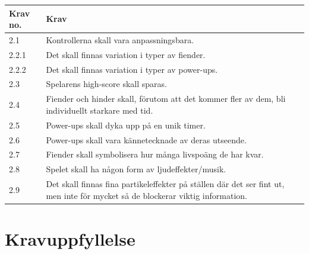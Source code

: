 \documentclass{TDP005mall}
\begin{document}
\begin{table}[!h]
\begin{tabularx}{\linewidth}{|l|X|}
\hline
Krav no. & Krav \\\hline
2.1 & Kontrollerna skall vara anpassningsbara. \\\hline

2.2.1 & Det skall finnas variation i typer av fiender. \\\hline

2.2.2 & Det skall finnas variation i typer av power-ups. \\\hline

2.3 & Spelarens high-score skall sparas. \\\hline

2.4 & Fiender och hinder skall, förutom att det kommer fler av dem, bli individuellt starkare med tid. \\\hline

2.5 & Power-ups skall dyka upp på en unik timer. \\\hline

2.6 & Power-ups skall vara kännetecknade av deras utseende. \\\hline

2.7 & Fiender skall symbolisera hur många livspoäng de har kvar. \\\hline

2.8 & Spelet skall ha någon form av ljudeffekter/musik. \\\hline

2.9 & Det skall finnas fina partikeleffekter på ställen där det ser fint ut, men inte för mycket så de blockerar viktig information. \\\hline

\end{tabularx}
\end{table}

\section{Kravuppfyllelse}
\end{document}
